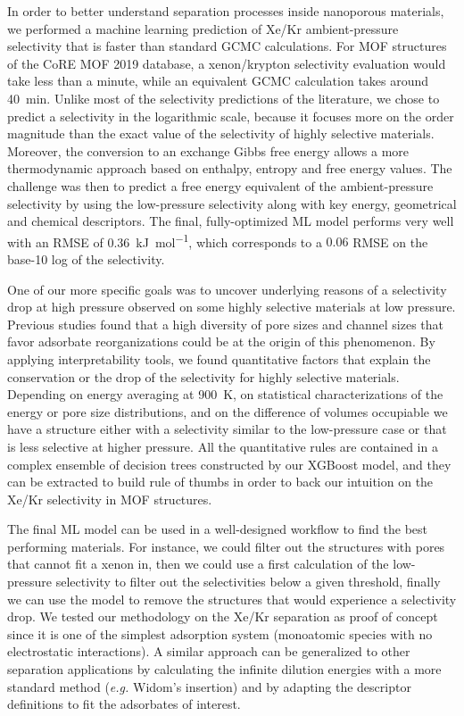 \documentclass[main]{subfiles}
\begin{document}
In order to better understand separation processes inside nanoporous materials, we performed a machine learning prediction of Xe/Kr ambient-pressure selectivity that is faster than standard GCMC calculations. For MOF structures of the CoRE MOF 2019 database, a xenon/krypton selectivity evaluation would take less than a minute, while an equivalent GCMC calculation takes around \SI{40}{\minute}. Unlike most of the selectivity predictions of the literature, we chose to predict a selectivity in the logarithmic scale, because it focuses more on the order magnitude than the exact value of the selectivity of highly selective materials. Moreover, the conversion to an exchange Gibbs free energy allows a more thermodynamic approach based on enthalpy, entropy and free energy values. The challenge was then to predict a free energy equivalent of the ambient-pressure selectivity by using the low-pressure selectivity along with key energy, geometrical and chemical descriptors. The final, fully-optimized ML model performs very well with an RMSE of \SI{0.36}{\kilo\joule\per\mole}, which corresponds to a $0.06$ RMSE on the base-10 log of the selectivity.

One of our more specific goals was to uncover underlying reasons of a selectivity drop at high pressure observed on some highly selective materials at low pressure. Previous studies found that a high diversity of pore sizes and channel sizes that favor adsorbate reorganizations could be at the origin of this phenomenon.\cite{Ren_2021} By applying interpretability tools, we found quantitative factors that explain the conservation or the drop of the selectivity for highly selective materials. Depending on energy averaging at \SI{900}{\kelvin}, on statistical characterizations of the energy or pore size distributions, and on the difference of volumes occupiable we have a structure either with a selectivity similar to the low-pressure case or that is less selective at higher pressure. All the quantitative rules are contained in a complex ensemble of decision trees constructed by our XGBoost model, and they can be extracted to build rule of thumbs in order to back our intuition on the Xe/Kr selectivity in MOF structures.

The final ML model can be used in a well-designed workflow to find the best performing materials. For instance, we could filter out the structures with pores that cannot fit a xenon in, then we could use a first calculation of the low-pressure selectivity to filter out the selectivities below a given threshold, finally we can use the model to remove the structures that would experience a selectivity drop. We tested our methodology on the Xe/Kr separation as proof of concept since it is one of the simplest adsorption system (monoatomic species with no electrostatic interactions). A similar approach can be generalized to other separation applications by calculating the infinite dilution energies with a more standard method (\emph{e.g.} Widom's insertion) and by adapting the descriptor definitions to fit the adsorbates of interest.
\end{document}

